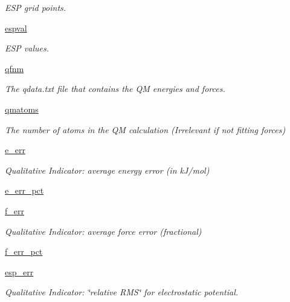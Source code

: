 \begin{DoxyCompactItemize}
\begin{DoxyCompactList}\small\item\em \-E\-S\-P grid points. \end{DoxyCompactList}\item 
\hyperlink{classforcebalance_1_1abinitio_1_1AbInitio_a011b973a1779275fe19fd1c72037b435}{espval}
\begin{DoxyCompactList}\small\item\em \-E\-S\-P values. \end{DoxyCompactList}\item 
\hyperlink{classforcebalance_1_1abinitio_1_1AbInitio_af8f5ab3fd98876e7ea923ed90c48e66d}{qfnm}
\begin{DoxyCompactList}\small\item\em \-The qdata.\-txt file that contains the \-Q\-M energies and forces. \end{DoxyCompactList}\item 
\hyperlink{classforcebalance_1_1abinitio_1_1AbInitio_a45edac867fa720c26a6f959c3dd5a139}{qmatoms}
\begin{DoxyCompactList}\small\item\em \-The number of atoms in the \-Q\-M calculation (\-Irrelevant if not fitting forces) \end{DoxyCompactList}\item 
\hyperlink{classforcebalance_1_1abinitio_1_1AbInitio_a003717f2442aac7d1067e74b89a14cc7}{e\-\_\-err}
\begin{DoxyCompactList}\small\item\em \-Qualitative \-Indicator\-: average energy error (in k\-J/mol) \end{DoxyCompactList}\item 
\hyperlink{classforcebalance_1_1abinitio_1_1AbInitio_ac04e91428155e8d5c4a1a14328e9cc99}{e\-\_\-err\-\_\-pct}
\item 
\hyperlink{classforcebalance_1_1abinitio_1_1AbInitio_a2df838b5d83710d5d35e3ccccbf7c656}{f\-\_\-err}
\begin{DoxyCompactList}\small\item\em \-Qualitative \-Indicator\-: average force error (fractional) \end{DoxyCompactList}\item 
\hyperlink{classforcebalance_1_1abinitio_1_1AbInitio_a0c48a57c247e6afe97fd178e8b5bce0d}{f\-\_\-err\-\_\-pct}
\item 
\hyperlink{classforcebalance_1_1abinitio_1_1AbInitio_a3a1a04d4af74efa8ff6a1fb8bb6bcc10}{esp\-\_\-err}
\begin{DoxyCompactList}\small\item\em \-Qualitative \-Indicator\-: \char`\"{}relative R\-M\-S\char`\"{} for electrostatic potential. \end{DoxyCompactList}\item 

\end{DoxyCompactItemize}
